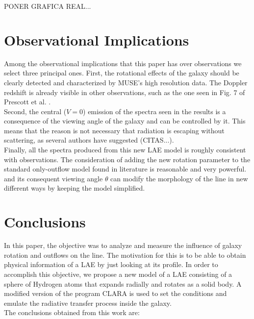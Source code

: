 \documentclass[twocolappendix]{latex/emulateapj}
\begin{document}
PONER GRAFICA REAL...\\

\section{Observational Implications}
\label{sec:observationalimplications}

Among the observational implications that this paper has over observations we select three principal ones. First, the rotational effects of the galaxy should be clearly detected and characterized by MUSE's high resolution data. The Doppler redshift is already visible in other observations, such as the one seen in Fig. 7 of Prescott et al. \cite{Prescott14}.\\

Second, the central ($V=0$) emission of the spectra seen in the results is a consequence of the viewing angle of the galaxy and can be controlled by it. This means that the reason is not necessary that radiation is escaping without scattering, as several authors have suggested (CITAS...).\\

Finally, all the spectra produced from this new LAE model is roughly consistent with observations. The consideration of adding the new rotation parameter to the standard only-outflow model found in literature is reasonable and very powerful. \vrot and its consequent viewing angle $\theta$ can modify the morphology of the \lya line in new different ways by keeping the model simplified.\\

\section{Conclusions}
\label{sec:conclusions}

In this paper, the objective was to analyze and measure the influence of galaxy rotation and outflows on the \lya line. The motivation for this is to be able to obtain physical information of a LAE by just looking at its \lya profile. In order to accomplish this objective, we propose a new model of a LAE consisting of a sphere of Hydrogen atoms that expands radially and rotates as a solid body. A modified version of the program CLARA \cite{CLARA} is used to set the conditions and emulate the radiative transfer process inside the galaxy. \\

The conclusions obtained from this work are: 
\end{document}
